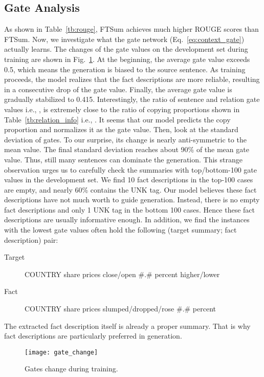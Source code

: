 \documentclass[letterpaper]{article} \usepackage{aaai18}  \usepackage{times}  \usepackage{helvet}  \usepackage{courier}  \usepackage{url}  \usepackage{graphicx}  \usepackage{amsfonts}
\begin{document}
	
	\subsection{Gate Analysis}
	As shown in Table~\ref{tb:rouge}, FTSum achieves much higher ROUGE scores than FTSum.
	Now, we investigate what the gate network (Eq.~\ref{eq:context_gate}) actually learns.
	The changes of the gate values on the development set during training are shown in Fig.~\ref{fig:gate_change}.
	At the beginning, the average gate value exceeds 0.5, which means the generation is biased to the source sentence.
	As training proceeds, the model realizes that the fact descriptions are more reliable, resulting in a consecutive drop of the gate value.
	Finally, the average gate value is gradually stabilized to 0.415.
	Interestingly, the ratio of sentence and relation gate values i.e.,
	, is extremely close to the ratio of copying proportions shown in Table~\ref{tb:relation_info} i.e.,
	.
	It seems that our model predicts the copy proportion and normalizes it as the gate value.
	Then, look at the standard deviation of gates.
	To our surprise, its change is nearly anti-symmetric to the mean value.
	The final standard deviation reaches about 90\% of the mean gate value.
	Thus, still many sentences can dominate the generation.
This strange observation urges us to carefully check the summaries with top/bottom-100 gate values in the development set.
	We find 10 fact descriptions in the top-100 cases are empty, and nearly 60\% contains the UNK tag.
	Our model believes these fact descriptions have not much worth to guide generation.
	Instead, there is no empty fact descriptions and only 1 UNK tag in the bottom 100 cases.
	Hence these fact descriptions are usually informative enough.
	In addition, we find the instances with the lowest gate values often hold the following (target summary; fact description) pair: 
	\begin{description}
		\item[Target] COUNTRY share prices close/open \#.\# percent higher/lower
		\item[Fact] COUNTRY share prices slumped/dropped/rose \#.\# percent
	\end{description}
	The extracted fact description itself is already a proper summary.
	That is why fact descriptions are particularly preferred in generation.
	
	\begin{figure}
		\centering
		\texttt{[image: gate\_change]}
		\caption{Gates change during training.}
		\label{fig:gate_change}
	\end{figure}
	
\end{document}

